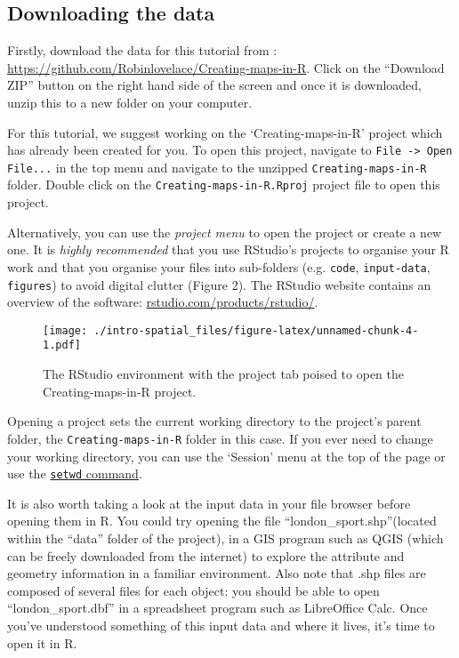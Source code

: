 \documentclass[]{article}
\begin{document}
\subsection{Downloading the data}\label{downloading-the-data}

Firstly, download the data for this tutorial from :
\href{https://github.com/Robinlovelace/Creating-maps-in-R}{\url{https://github.com/Robinlovelace/Creating-maps-in-R}}.
Click on the ``Download ZIP'' button on the right hand side of the
screen and once it is downloaded, unzip this to a new folder on your
computer.

For this tutorial, we suggest working on the `Creating-maps-in-R'
project which has already been created for you. To open this project,
navigate to \texttt{File -\textgreater{} Open File...} in the top menu
and navigate to the unzipped \texttt{Creating-maps-in-R} folder. Double
click on the \texttt{Creating-maps-in-R.Rproj} project file to open this
project.

Alternatively, you can use the \emph{project menu} to open the project
or create a new one. It is \emph{highly recommended} that you use
RStudio's projects to organise your R work and that you organise your
files into sub-folders (e.g. \texttt{code}, \texttt{input-data},
\texttt{figures}) to avoid digital clutter (Figure 2). The RStudio
website contains an overview of the software:
\href{http://www.rstudio.com/products/rstudio/}{rstudio.com/products/rstudio/}.

\begin{figure}[htbp]
\centering
\texttt{[image: ./intro-spatial\_files/figure-latex/unnamed-chunk-4-1.pdf]}
\caption{The RStudio environment with the project tab poised to open the
Creating-maps-in-R project.}
\end{figure}

Opening a project sets the current working directory to the project's
parent folder, the \texttt{Creating-maps-in-R} folder in this case. If
you ever need to change your working directory, you can use the
`Session' menu at the top of the page or use the
\href{http://www.statmethods.net/interface/workspace.html}{\texttt{setwd}
command}.

It is also worth taking a look at the input data in your file browser
before opening them in R. You could try opening the file
``london\_sport.shp''(located within the ``data'' folder of the
project), in a GIS program such as QGIS (which can be freely downloaded
from the internet) to explore the attribute and geometry information in
a familiar environment. Also note that .shp files are composed of
several files for each object: you should be able to open
``london\_sport.dbf'' in a spreadsheet program such as LibreOffice Calc.
Once you've understood something of this input data and where it lives,
it's time to open it in R.
\end{document}
